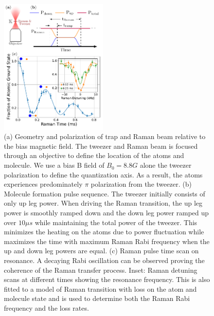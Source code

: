 \documentclass[aps,prl,twocolumn,superscriptaddress]{revtex4-1}
\begin{document}
\begin{figure}[ht!]
  \includegraphics[width=0.48\textwidth]{fig2.pdf}
  \caption{
    (a) Geometry and polarization of trap and Raman beam relative to the bias magnetic field.
    The tweezer and Raman beam is focused through an objective to define the location of the
    atoms and molecule.
    We use a bias B field of $B_0=8.8 G$ alone the tweezer polarization
    to define the quantization axis.
    As a result, the atoms experiences predominately $\pi$ polarization from the tweezer.
    (b) Molecule formation pulse sequence. The tweezer initially consists of only up leg power.
    When driving the Raman transition, the up leg power is smoothly ramped down and
    the down leg power ramped up over $10\mu s$ while maintaining the total power of the tweezer.
    This minimizes the heating on the atoms due to power fluctuation while maximizes the time
    with maximum Raman Rabi frequency when the up and down leg powers are equal.
    (c) Raman pulse time scan on resonance.
    A decaying Rabi oscillation can be observed proving the coherence of
    the Raman transfer process.
    Inset: Raman detuning scans at different times showing the resonance frequency.
    This is also fitted to a model of Raman transition
    with loss on the atom and molecule state and is used to determine
    both the Raman Rabi frequency and the loss rates.
    \label{f-raman}}
\end{figure}
\end{document}
